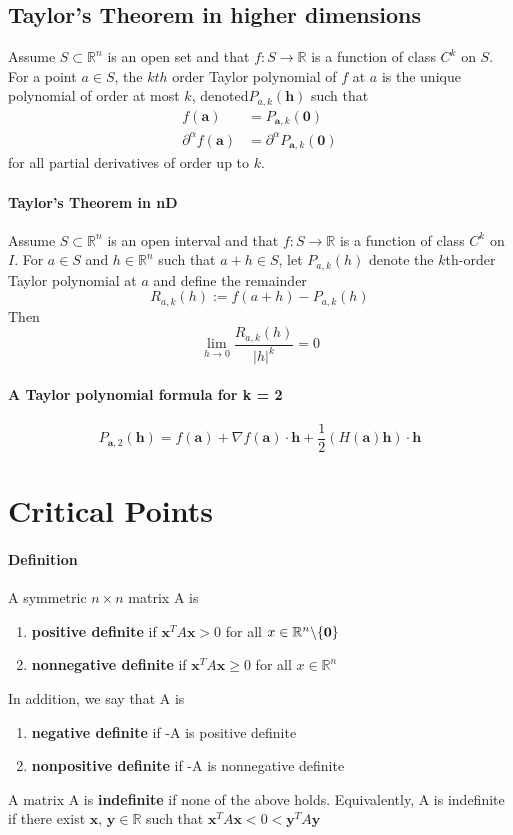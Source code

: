 \documentclass[11pt]{article}
\newcommand{\tb}[1]{\textbf{#1}}
\newcommand{\real}[0]{\mathbb{R}}
\begin{document}
\subsection{Taylor's Theorem in higher dimensions}
Assume $S \subset \real^n$ is an open set and that $f: S \rightarrow \real$ is a function of class $C^k$ on $S$. For a point $a\in S$, the $kth$ order Taylor polynomial of $f$ at $a$ is the unique polynomial of order at most $k$, denoted$P_{a,k}(\tb{h})$ such that
\begin{align*}
	f(\tb{a}) &= P_{\tb{a},k}(\tb{0}) \\
	\partial^\alpha f(\tb{a}) &= \partial^\alpha P_{\tb{a},k}(\tb{0})
\end{align*}
for all partial derivatives of order up to $k$.

\paragraph{Taylor's Theorem in nD}Assume $S \subset \real^n$ is an open interval and that $f: S \rightarrow \real$ is a function of class $C^k$ on $I$. For $a \in S$ and $h \in \real^n$ such that $a+h\in S$, let $P_{a,k}(h)$ denote the $k$th-order Taylor polynomial at $a$ and define the remainder
$$R_{a,k}(h) := f(a+h) - P_{a,k}(h)$$
Then $$\lim_{h\rightarrow0}\frac{R_{a,k}(h)}{|h|^k} = 0$$

\paragraph{A Taylor polynomial formula for k = 2}
$$P_{\tb{a},2}(\tb{h}) = f(\tb{a}) + \nabla f(\tb{a})\cdot \tb{h} + \frac{1}{2}(H(\tb{a})\tb{h})\cdot \tb{h}$$

\section{Critical Points}
\paragraph{Definition} A symmetric $n \times n$ matrix A is
\begin{enumerate}
    \item \tb{positive definite} if $\tb{x}^T A \tb{x} > 0$ for all $x \in \real^n \symbol{92} \{\tb{0}\}$
    \item \tb{nonnegative definite} if $\tb{x}^T A \tb{x} \geq 0$ for all $x \in \real^n$
\end{enumerate}
In addition, we say that A is
\begin{enumerate}
    \item \tb{negative definite} if -A is positive definite
    \item \tb{nonpositive definite} if -A is nonnegative definite
\end{enumerate}
A matrix A is \tb{indefinite} if none of the above holds. Equivalently, A is indefinite if there exist $\tb{x, y}\in \real$ such that $\tb{x}^TA\tb{x} < 0 < \tb{y}^TA\tb{y}$
\end{document}
